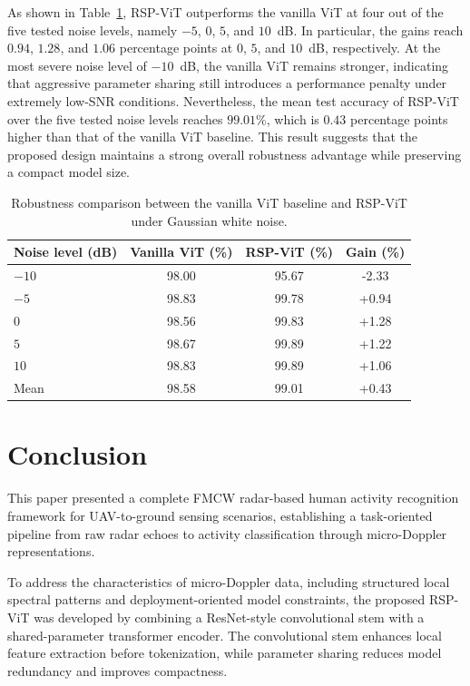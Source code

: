 \documentclass{svproc}
\begin{document}
As shown in Table~\ref{tab:robustness_compare}, RSP-ViT outperforms the vanilla ViT at four out of the five tested noise levels, namely $-5$, $0$, $5$, and $10$~dB. In particular, the gains reach $0.94$, $1.28$, and $1.06$ percentage points at $0$, $5$, and $10$~dB, respectively. At the most severe noise level of $-10$~dB, the vanilla ViT remains stronger, indicating that aggressive parameter sharing still introduces a performance penalty under extremely low-SNR conditions. Nevertheless, the mean test accuracy of RSP-ViT over the five tested noise levels reaches $99.01\%$, which is $0.43$ percentage points higher than that of the vanilla ViT baseline. This result suggests that the proposed design maintains a strong overall robustness advantage while preserving a compact model size.

\begin{table}[t]
\caption{Robustness comparison between the vanilla ViT baseline and RSP-ViT under Gaussian white noise.}
\label{tab:robustness_compare}
\centering
\small
\begin{tabular}{lccc}
\hline
Noise level (dB) & Vanilla ViT (\%) & RSP-ViT (\%) & Gain (\%) \\
\hline
$-10$ & 98.00 & 95.67 & -2.33 \\
$-5$  & 98.83 & 99.78 & +0.94 \\
$0$   & 98.56 & 99.83 & +1.28 \\
$5$   & 98.67 & 99.89 & +1.22 \\
$10$  & 98.83 & 99.89 & +1.06 \\
Mean  & 98.58 & 99.01 & +0.43 \\
\hline
\end{tabular}
\end{table}






\section{Conclusion}

This paper presented a complete FMCW radar-based human activity recognition framework for UAV-to-ground sensing scenarios, establishing a task-oriented pipeline from raw radar echoes to activity classification through micro-Doppler representations.

To address the characteristics of micro-Doppler data, including structured local spectral patterns and deployment-oriented model constraints, the proposed RSP-ViT was developed by combining a ResNet-style convolutional stem with a shared-parameter transformer encoder. The convolutional stem enhances local feature extraction before tokenization, while parameter sharing reduces model redundancy and improves compactness.
\end{document}
